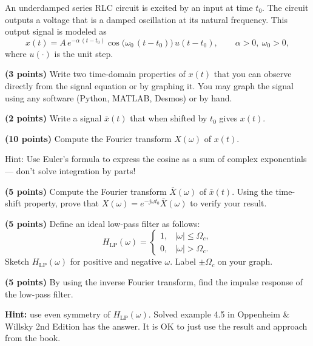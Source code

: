 \documentclass{ee102_pset}
\author{\rule{3cm}{0.4pt}}
\begin{document}
 An underdamped series RLC circuit is excited by an input at time \(t_0\). The circuit outputs a voltage that is a damped oscillation at its natural frequency. This output signal is modeled as
\[
x(t)=A\,e^{-\alpha\,(t-t_0)}\cos\!\big(\omega_0\,(t-t_0)\big)\,u(t-t_0),
\qquad
\alpha>0,\ \omega_0>0,
\]
where \(u(\cdot)\) is the unit step. 

\problempart \textbf{(3 points)}
Write two time-domain properties of \(x(t)\) that you can observe directly from the signal equation or by graphing it. You may graph the signal using any software (Python, MATLAB, Desmos) or by hand.

\problempart \textbf{(2 points)} Write a signal $\bar{x}(t)$ that when shifted by \(t_0\) gives \(x(t)\).

\problempart \textbf{(10 points)}
Compute the Fourier transform \(X(\omega)\) of \(x(t)\).

Hint: Use Euler's formula to express the cosine as a sum of complex exponentials --- don't solve integration by parts!

\problempart \textbf{(5 points)} Compute the Fourier transform $\bar X(\omega)$ of $\bar x(t)$. Using the time-shift property, prove that \(X(\omega) = e^{-j\omega t_0} \bar{X}(\omega)\) to verify your result.




\problempart \textbf{(5 points)}
Define an ideal low-pass filter as follows:
\[
H_{\mathrm{LP}}(\omega)=
\begin{cases}
1,& |\omega|\le \Omega_c,\\
0,& |\omega|>\Omega_c.
\end{cases}
\]
Sketch \(H_{\mathrm{LP}}(\omega)\) for positive and negative \(\omega\). Label \(\pm\Omega_c\) on your graph.

\problempart \textbf{(5 points)}
By using the inverse Fourier transform, find the impulse response of the low-pass filter. 


\textbf{Hint:} use even symmetry of \(H_{\mathrm{LP}}(\omega)\). Solved example 4.5 in Oppenheim \& Willsky 2nd Edition has the answer. It is OK to just use the result and approach from the book.
\end{document}
